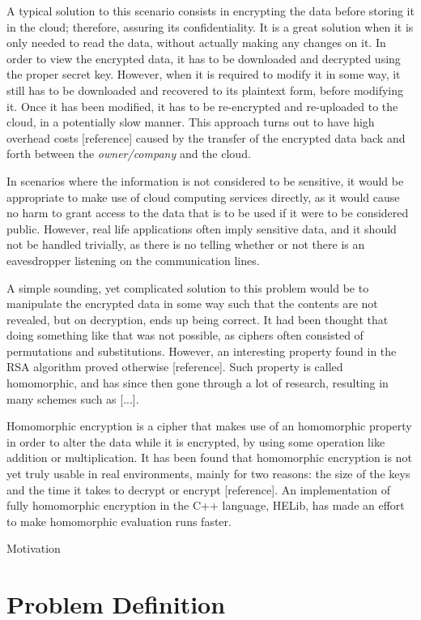 A typical solution to this scenario consists in encrypting the data before storing it in the cloud; therefore, assuring its confidentiality. It is a great solution when it is only needed to read the data, without actually making any changes on it. In order to view the encrypted data, it has to be downloaded and decrypted using the proper secret key. However, when it is required to modify it in some way, it still has to be downloaded and recovered to its plaintext form, before modifying it. Once it has been modified, it has to be re-encrypted and re-uploaded to the cloud, in a potentially slow manner.
This approach turns out to have high overhead costs [reference] caused by the transfer of the encrypted data back and forth between the \textit{owner/company} and the cloud.

In scenarios where the information is not considered to be sensitive, it would be appropriate to make use of cloud computing services directly, as it would cause no harm to grant access to the data that is to be used if it were to be considered public. However, real life applications often imply sensitive data, and it should not be handled trivially, as there is no telling whether or not there is an eavesdropper listening on the communication lines.

A simple sounding, yet complicated solution to this problem would be to manipulate the encrypted data in some way such that the contents are not revealed, but on decryption, ends up being correct. It had been thought that doing something like that was not possible, as ciphers often consisted of permutations and substitutions. However, an interesting property found in the RSA algorithm proved otherwise [reference]. Such property is called homomorphic, and has since then gone through a lot of research, resulting in many schemes such as [...].

Homomorphic encryption is a cipher that makes use of an homomorphic property in order to alter the data while it is encrypted, by using some operation like addition or multiplication. It has been found that homomorphic encryption is not yet truly usable in real environments, mainly for two reasons: the size  of the keys and the time it takes to decrypt or encrypt [reference].  An implementation of fully homomorphic encryption in the C++ language, HELib, has made an effort to make homomorphic evaluation runs faster.

Motivation


\section{Problem Definition}

